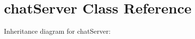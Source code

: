 \hypertarget{classchatServer}{}\section{chat\+Server Class Reference}
\label{classchatServer}


Inheritance diagram for chat\+Server\+:
